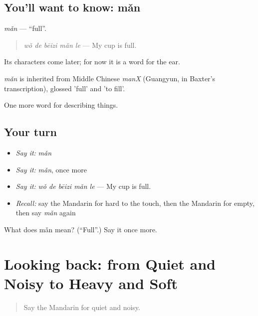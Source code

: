 \subsection*{You'll want to know: mǎn}
\emph{mǎn} — \textquotedblleft{}full\textquotedblright{}.

\begin{quote}
\emph{wǒ de bēizi mǎn le} — My cup is full.
\end{quote}

Its characters come later; for now it is a word for the ear.

\begin{cousinweb}
\emph{mǎn} is inherited from Middle Chinese \emph{manX} (Guangyun, in Baxter's transcription), glossed 'full' and 'to fill'.
\end{cousinweb}

\begin{grammarlens}[title={What you've built}]
One more word for describing things.
\end{grammarlens}

\subsection*{Your turn}
\begin{itemize}
\raggedright
  \item \emph{Say it:} \emph{mǎn}
  \item \emph{Say it:} \emph{mǎn}, once more
  \item \emph{Say it:} \emph{wǒ de bēizi mǎn le} — My cup is full.
  \item \emph{Recall:} say the Mandarin for hard to the touch, then the Mandarin for empty, then say \emph{mǎn} again
\end{itemize}

\begin{tcolorbox}[breakable,colback=teal!4,colframe=teal!35!black,title={Before you move on}]
What does mǎn mean? (\textquotedblleft{}Full\textquotedblright{}.) Say it once more.
\end{tcolorbox}
\section[(dialogue)]{Looking back: from Quiet and Noisy to Heavy and Soft}

\label{lesson:ZH-R134-review-129-134}



\begin{quote}
Say the Mandarin for quiet and noisy.
\end{quote}

